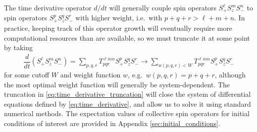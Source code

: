 \documentclass[aps,notitlepage,nofootinbib,11pt]{revtex4-1}
\newcommand{\f}[2]{\dfrac{#1}{#2}} %
\newcommand{\p}[1]{\left(#1\right)} %
\newcommand{\1}{\mathds{1}}
\begin{document}
The time derivative operator $d/dt$ will generally couple spin
operators $S_+^\ell S_z^m S_-^n$ to spin operators $S_+^p S_z^q S_-^r$
with higher weight, i.e.~with $p+q+r>\ell+m+n$.  In practice, keeping
track of this operator growth will eventually require more
computational resources than are available, so we must truncate it at
some point by taking
\begin{align}
  \f{d}{dt} \p{S_+^\ell S_z^m S_-^n}
  = \sum_{p,q,r} T^{\ell m n}_{pqr} S_+^p S_z^q S_-^r
  \to \sum_{w\p{p,q,r}<W} T^{\ell m n}_{pqr} S_+^p S_z^q S_-^r
  \label{eq:time_derivative_truncation}
\end{align}
for some cutoff $W$ and weight function $w$, e.g.~$w\p{p,q,r}=p+q+r$,
although the most optimal weight function will generally be
system-dependent.  The truncation in
\eqref{eq:time_derivative_truncation} will close the system of
differential equations defined by \eqref{eq:time_derivative}, and
allow us to solve it using standard numerical methods.  The
expectation values of collective spin operators for initial conditions
of interest are provided in Appendix \ref{sec:initial_conditions}.
\end{document}
